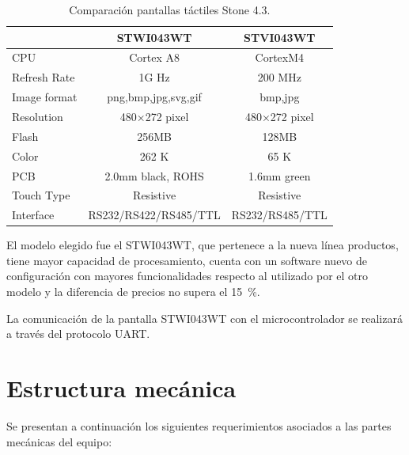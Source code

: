 \begin{table}[!ht]
	\centering
	\caption[Comparación Stone]{Comparación pantallas táctiles Stone 4.3.}
	\begin{tabular}{l c c }    
		\toprule
		\textbf{}     & \textbf{STWI043WT} & \textbf{STVI043WT} \\
		\midrule
		CPU 			& 	Cortex A8         		& 	CortexM4 			 	\\		
		Refresh Rate    & 	1G Hz         			& 	200 MHz 				\\
		Image format  	& 	png,bmp,jpg,svg,gif     & 	bmp,jpg 				\\
		Resolution		& 	480×272 pixel	        & 	480×272 pixel 			\\
		Flash  			& 	256MB         			& 	128MB 					\\
		Color  			& 	262 K	          		& 	65 K 					\\
		PCB 			& 	2.0mm black, ROHS       & 	1.6mm green 			\\
		Touch Type		& 	Resistive    			& 	Resistive				\\
		Interface 		& 	RS232/RS422/RS485/TTL   & 	RS232/RS485/TTL			\\
		\bottomrule
		\hline
	\end{tabular}
	\label{tab:tabla_stone}
\end{table}


El modelo elegido fue el STWI043WT, que pertenece a la nueva línea productos, tiene mayor capacidad de procesamiento, cuenta con un software nuevo de configuración con mayores funcionalidades respecto al utilizado por el otro modelo y la diferencia de precios no supera el \SI{15}{\percent}.  

La comunicación de la pantalla STWI043WT con el microcontrolador se realizará a través del protocolo UART.



\section{Estructura mecánica}
\label{sec:estructura_mecanica}

Se presentan a continuación los siguientes requerimientos asociados a las partes mecánicas del equipo: 

